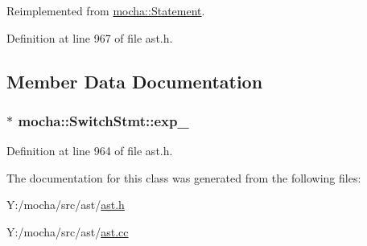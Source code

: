 Reimplemented from \hyperlink{classmocha_1_1_statement_ad0e8c3ef62d21f733eb50a414046bae4}{mocha::Statement}.



Definition at line 967 of file ast.h.



\subsection{Member Data Documentation}
\hypertarget{classmocha_1_1_switch_stmt_a8a0c629a36e6a8842baa2597c0272e85}{
\subsubsection[{exp\_\-}]{$\ast$ {\bf mocha::SwitchStmt::exp\_\-}}}
\label{classmocha_1_1_switch_stmt_a8a0c629a36e6a8842baa2597c0272e85}


Definition at line 964 of file ast.h.



The documentation for this class was generated from the following files:\begin{DoxyCompactItemize}
\item 
Y:/mocha/src/ast/\hyperlink{ast_8h}{ast.h}\item 
Y:/mocha/src/ast/\hyperlink{ast_8cc}{ast.cc}\end{DoxyCompactItemize}
